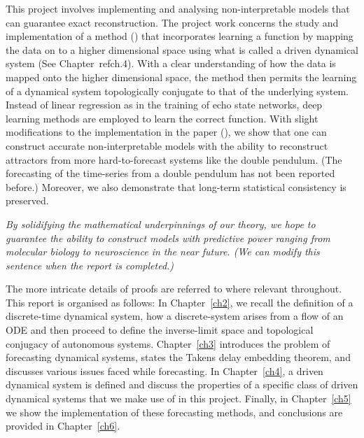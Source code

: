 This project involves implementing and analysing non-interpretable models that can guarantee exact reconstruction. 
The project work concerns the study and implementation of a method (\cite{manjunath2021universal}) that incorporates learning a function by mapping the data on to a higher dimensional space using what is called a driven dynamical system (See Chapter~ref{ch.4}). With a clear understanding of how the data is mapped onto the higher dimensional space, the method then permits the learning of a dynamical system topologically conjugate to that of the underlying system. Instead of linear regression as in the training of echo state networks, deep learning methods are employed to learn the correct function. With slight modifications to the implementation in the paper (\cite{manjunath2021universal}), we show that one can construct accurate non-interpretable models with the ability to reconstruct attractors from more hard-to-forecast systems like the double pendulum. (The forecasting of the time-series from a double pendulum has not been reported before.) Moreover, we also demonstrate that long-term statistical consistency is preserved.

\emph{By solidifying the mathematical underpinnings of our theory, we hope to guarantee the ability to construct models with predictive power ranging from molecular biology to neuroscience in the near future. (We can modify this sentence when the report is completed.)}

The more intricate details of proofs are referred to where relevant throughout. This report is organised as follows: 
\newline In Chapter~\ref{ch2}, we recall the definition of a discrete-time dynamical system, how a discrete-system arises from a flow of an ODE and then proceed to define the inverse-limit space and topological conjugacy of autonomous systems. 
\newline Chapter~\ref{ch3} introduces the problem of forecasting dynamical systems, states the Takens delay embedding theorem, and discusses various issues faced while forecasting. 
\newline In Chapter~\ref{ch4}, a driven dynamical system is defined and discuss the properties of a specific class of driven dynamical systems that we make use of in this project.
\newline Finally, in Chapter~\ref{ch5} we show the implementation of these forecasting methods, and conclusions are provided in Chapter~\ref{ch6}.


